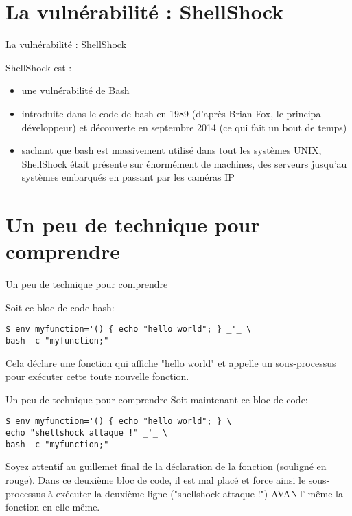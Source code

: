 \documentclass[11pt]{beamer}
\begin{document}
\section{La vulnérabilité : ShellShock}
\begin{frame}{La vulnérabilité : ShellShock}
\noindent
 \parbox[t]{8cm}{
ShellShock est : 
\begin{itemize}
\item une vulnérabilité de Bash
\item introduite dans le code de bash en 1989 (d'après Brian Fox, le principal développeur)  et découverte en septembre 2014 (ce qui fait un bout de temps)
\item sachant que bash est massivement utilisé dans tout les systèmes UNIX, ShellShock était présente sur énormément de machines, des serveurs jusqu'au systèmes embarqués en passant par les caméras IP
\end{itemize}}
     \hfill
\end{frame}

\section{Un peu de technique pour comprendre}
\begin{frame}[fragile]{Un peu de technique pour comprendre}

Soit ce bloc de code bash:

\begin{lstlisting}
$ env myfunction='() { echo "hello world"; } _'_ \
bash -c "myfunction;"
\end{lstlisting}
Cela déclare une fonction qui affiche "hello world" et appelle un sous-processus pour exécuter cette toute nouvelle fonction.
\end{frame}

\begin{frame}[fragile]{Un peu de technique pour comprendre}
Soit maintenant ce bloc de code:

\begin{lstlisting}
$ env myfunction='() { echo "hello world"; } \
echo "shellshock attaque !" _'_ \
bash -c "myfunction;"
\end{lstlisting}

Soyez attentif au guillemet final de la déclaration de la fonction (souligné en rouge). Dans ce deuxième bloc de code, il est mal placé et force ainsi le sous-processus à exécuter la deuxième ligne ("shellshock attaque !") AVANT même la fonction en elle-même.

\end{frame}
\end{document}
